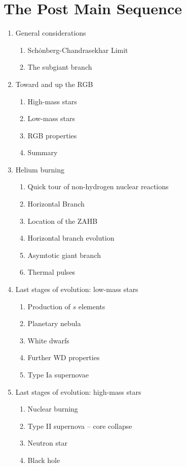 \documentclass{article}
\begin{document}
\section{The Post Main Sequence}
\begin{enumerate}
    \item General considerations
        \begin{enumerate}
            \item Sch\.{o}nberg-Chandrasekhar Limit
            \item The subgiant branch
        \end{enumerate}
    \item Toward and up the RGB
        \begin{enumerate}
            \item High-mass stars
            \item Low-mass stars
            \item RGB properties
            \item Summary
        \end{enumerate}
    \item Helium burning
        \begin{enumerate}
            \item Quick tour of non-hydrogen nuclear reactions
            \item Horizontal Branch
            \item Location of the ZAHB
            \item Horizontal branch evolution
            \item Asymtotic giant branch
            \item Thermal pulses
        \end{enumerate}
    \item Last stages of evolution: low-mass stars
        \begin{enumerate}
            \item Production of $s$ elements
            \item Planetary nebula
            \item White dwarfs
            \item Further WD properties
            \item Type Ia supernovae
        \end{enumerate}
    \item Last stages of evolution: high-mass stars
        \begin{enumerate}
            \item Nuclear burning
            \item Type II supernova -- core collapse
            \item Neutron star
            \item Black hole
        \end{enumerate}
\end{enumerate}
\end{document}
